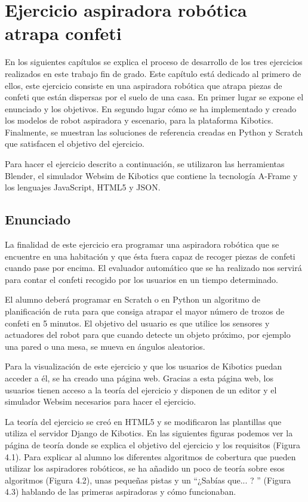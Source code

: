 \chapter{Ejercicio aspiradora robótica atrapa confeti}\label{chap:aspiradora}
En los siguientes capítulos se explica el proceso de desarrollo de los tres ejercicios realizados en este trabajo fin de grado. Este capítulo está dedicado al primero de ellos, este ejercicio consiste en una aspiradora robótica que atrapa piezas de confeti que están dispersas por el suelo de una casa. En primer lugar se expone el enunciado y los objetivos. En segundo lugar cómo se ha implementado y creado los modelos de robot aspiradora y escenario, para la plataforma Kibotics. Finalmente, se muestran las soluciones de referencia creadas en Python y Scratch que satisfacen el objetivo del ejercicio.

Para hacer el ejercicio descrito a continuación, se utilizaron las herramientas Blender, el simulador Websim de Kibotics que contiene la tecnología A-Frame y los lenguajes JavaScript, HTML5 y JSON.

\section{Enunciado}
La finalidad de este ejercicio era programar una aspiradora robótica que se encuentre en una habitación y que ésta fuera capaz de recoger piezas de confeti cuando pase por encima. El evaluador automático que se ha realizado nos servirá para contar el confeti recogido por los usuarios en un tiempo determinado.

El alumno deberá programar en Scratch o en Python un algoritmo de planificación de ruta para que consiga atrapar el mayor número de trozos de confeti en 5 minutos. El objetivo del usuario es que utilice los sensores y actuadores del robot para que cuando detecte un objeto próximo, por ejemplo una pared o una mesa, se mueva en ángulos aleatorios. 

Para la visualización de este ejercicio y que los usuarios de Kibotics puedan acceder a él, se ha creado una página web. Gracias a esta página web, los usuarios tienen acceso a la teoría del ejercicio y  disponen de un editor y el simulador Websim necesarios para hacer el ejercicio. 

La teoría del ejercicio se creó en HTML5 y se modificaron las plantillas que utiliza el servidor Django de Kibotics.
En las siguientes figuras podemos ver la página de teoría donde se explica el objetivo del ejercicio y los requisitos (Figura 4.1). Para explicar al alumno los diferentes algoritmos de cobertura que pueden utilizar los aspiradores robóticos, se ha añadido un poco de teoría sobre esos algoritmos (Figura  4.2), unas pequeñas pistas y un ``¿Sabías que... ? '' (Figura 4.3) hablando de las primeras aspiradoras y cómo funcionaban. 
\\

